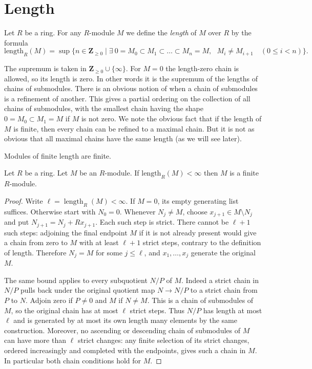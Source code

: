 \section{Length}
\label{section-length}

\begin{definition}
\label{definition-length}
Let $R$ be a ring. For any $R$-module $M$
we define the {\it length} of $M$ over $R$ by the
formula
$$
\text{length}_R(M)
=
\sup
\{
n \in \mathbf Z_{\geq0}
\mid
\exists\ 0 = M_0 \subset M_1 \subset \ldots \subset M_n = M,
\text{ }M_i \not = M_{i + 1}\quad(0\leq i<n)
\}.
$$
\end{definition}

\noindent
The supremum is taken in $\mathbf Z_{\geq0}\cup\{\infty\}$.
For $M=0$ the length-zero chain is allowed, so its length is zero.
In other words it is the supremum of the lengths of chains
of submodules. There is an obvious notion of when a chain
of submodules is a refinement of another. This gives a
partial ordering on the collection of all chains of submodules,
with the smallest chain having the shape $0 = M_0 \subset M_1 = M$
if $M$ is not zero.
We note the obvious fact that if the length of
$M$ is finite, then every chain can be refined to a
maximal chain. But it is not as obvious that all maximal
chains have the same length (as we will see later).

\begin{lemma}
\label{lemma-finite-length-finite}
\begin{slogan}
Modules of finite length are finite.
\end{slogan}
Let $R$ be a ring.
Let $M$ be an $R$-module.
If $\text{length}_R(M) < \infty$ then $M$ is a finite $R$-module.
\end{lemma}

\begin{proof}
Write $\ell=\operatorname{length}_R(M)<\infty$.
If $M=0$, its empty generating list suffices. Otherwise start with
$N_0=0$. Whenever $N_j\neq M$, choose
$x_{j+1}\in M\setminus N_j$ and put
$N_{j+1}=N_j+Rx_{j+1}$. Each such step is strict.
There cannot be $\ell+1$ such steps: adjoining the final endpoint
$M$ if it is not already present would give a chain from zero
to $M$ with at least $\ell+1$ strict steps, contrary to the
definition of length. Therefore $N_j=M$ for some $j\leq\ell$,
and $x_1,\ldots,x_j$ generate the original $M$.

The same bound applies to every subquotient $N/P$ of $M$.
Indeed a strict chain in $N/P$ pulls back under the original
quotient map $N\to N/P$ to a strict chain from $P$ to $N$.
Adjoin zero if $P\neq0$ and $M$ if $N\neq M$. This is a
chain of submodules of $M$, so the original chain has at most
$\ell$ strict steps. Thus $N/P$ has length at most $\ell$
and is generated by at most its own length many elements by the
same construction. Moreover, no ascending or descending chain
of submodules of $M$ can have more than $\ell$ strict changes:
any finite selection of its strict changes, ordered increasingly
and completed with the endpoints, gives such a chain in $M$.
In particular both chain conditions hold for $M$.
\end{proof}

